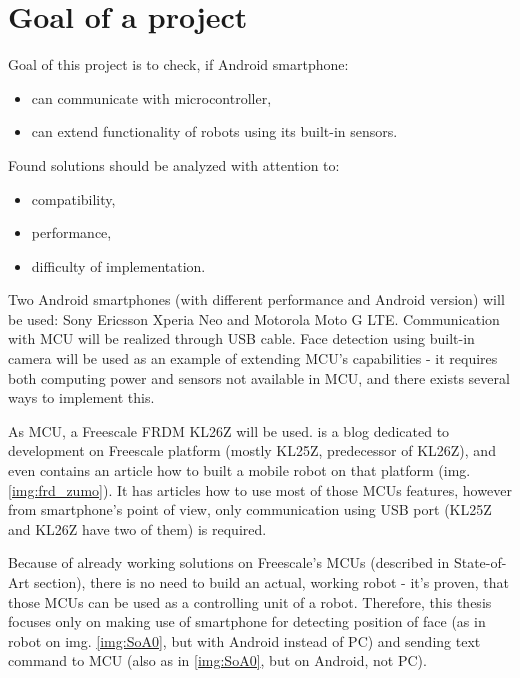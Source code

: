 \section{Goal of a project}
Goal of this project is to check, if Android smartphone:
\begin{itemize}
  \item can communicate with microcontroller,
  \item can extend functionality of robots using its built-in sensors.
\end{itemize}
Found solutions should be analyzed with attention to:
\begin{itemize}
  \item compatibility,
  \item performance,
  \item difficulty of implementation.
\end{itemize}
Two Android smartphones (with different performance and Android version) will be
used: Sony Ericsson Xperia Neo and Motorola Moto G LTE.
Communication with MCU will be realized through USB cable.
Face detection using built-in camera will be used as an example of extending
MCU's capabilities - it requires both computing power and sensors not available
in MCU, and there exists several ways to implement this.

As MCU, a Freescale FRDM KL26Z will be used. 
\cite{mcu_on_eclipse} is a blog dedicated to development on Freescale platform
(mostly KL25Z, predecessor of KL26Z), and even contains an article how to built a mobile robot on that
platform (img. \ref{img:frd_zumo}).
It has articles how to use most of those MCUs features, however from
smartphone's point of view, only communication using USB port (KL25Z and KL26Z
have two of them) is required.

Because of already working solutions on Freescale's MCUs (described in
State-of-Art section), there is no need to build an actual, working robot - it's
proven, that those MCUs can be used as a controlling unit of a robot.
Therefore, this thesis focuses only on making use of smartphone for detecting
position of face (as in robot on img. \ref{img:SoA0}, but with Android instead
of PC) and sending text command to MCU (also as in \ref{img:SoA0}, but on
Android, not PC).


